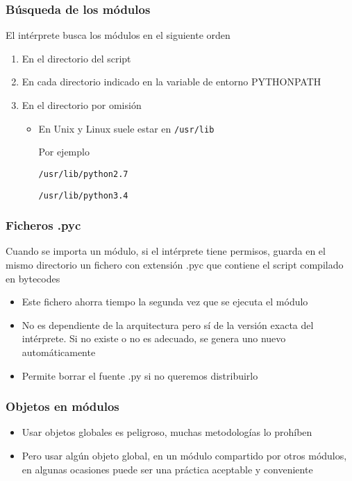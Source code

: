 \documentclass[ucs]{beamer}
\begin{document}
\begin{frame}[fragile]
\frametitle{Búsqueda de los módulos}
El intérprete busca los módulos en el siguiente orden

\begin{enumerate}
\item
En el directorio del script
\item
En cada directorio indicado en la variable de entorno PYTHONPATH
\item
En el directorio por omisión

\begin{itemize}
\item
En Unix y Linux suele estar en
\verb|/usr/lib|

Por ejemplo

\verb|/usr/lib/python2.7|

\verb|/usr/lib/python3.4|
\end{itemize}
\end{enumerate}
\end{frame}


\begin{frame}[fragile]
\frametitle{Ficheros .pyc}

Cuando se importa un módulo, si el intérprete tiene permisos, guarda en el mismo
directorio un fichero con extensión .pyc que contiene el script compilado
en bytecodes

\begin{itemize}
\item
Este fichero ahorra tiempo la segunda vez que se ejecuta el módulo
\item
No es dependiente de la arquitectura pero sí de la versión exacta del intérprete. Si no
existe o no es adecuado, se genera uno nuevo automáticamente
\item
Permite borrar el fuente .py si no queremos distribuirlo
\end{itemize}

\end{frame}


\begin{frame}[fragile]
\frametitle{Objetos en módulos}
\begin{itemize}
\item
Usar objetos globales es peligroso, muchas metodologías lo prohíben
\item
Pero usar algún objeto global, en un módulo compartido por otros módulos,
en algunas ocasiones
puede ser una práctica aceptable y conveniente 
\end{itemize}

\end{frame}
\end{document}
